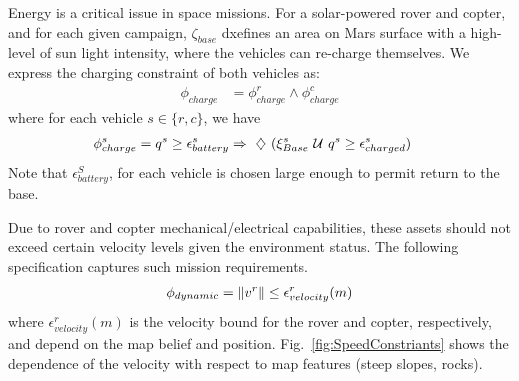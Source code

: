 \documentclass[conference]{IEEEtran}
\begin{document}
\noindent{} Energy is a critical issue in space missions. For a solar-powered rover and copter, and for each given campaign, $\zeta_{base}$ dxefines an area on Mars surface with a high-level of sun light intensity, where the vehicles can re-charge themselves. We express the charging constraint of both vehicles as:
 	\begin{align}
	    \phi_{charge} &= \phi_{charge}^r \land \phi_{charge}^c
	\end{align}
	where for each vehicle $s \in \{r, c\}$, we have
	\begin{align}
	    \phi_{charge}^s &= q^s \geq \epsilon_{battery}^s \Rightarrow \ \diamondsuit\  (\xi^s_{Base} \ \mathcal{U}\  q^s \geq \epsilon_{charged}^s)
	\end{align}
	Note that $\epsilon_{battery}^S$, for each vehicle is chosen large enough to permit return to the base.

\noindent{} Due to rover and copter mechanical/electrical capabilities, these assets should not exceed certain velocity levels given the environment status. The following specification captures such mission requirements.
    \begin{align}
	    \phi_{dynamic} = \left\| {v^r} \right\| \leq \epsilon_{velocity}^r(m)
	\end{align}
	where $\epsilon_{velocity}^r(m)$ is the velocity
	bound for the rover and copter, respectively, and depend on the map belief and position.
	Fig.~\ref{fig:SpeedConstriants} shows the dependence of the velocity with respect to
	map features (steep slopes, rocks).
	


	
	
	
	
\end{document}
